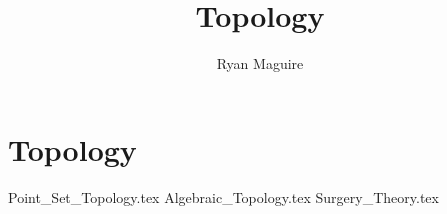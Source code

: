 \documentclass[crop=false,class=book,oneside]{standalone}
\begin{document}
    \newif\ifmathcourses
    \ifx\ifmain\undefined
        \title{Topology}
        \author{Ryan Maguire}
        \date{\vspace{-5ex}}
        \maketitle
        \tableofcontents
        \listoffigures
        \listoftables
        \clearpage
    \fi
    \part{Topology}
        {Point_Set_Topology.tex}
        {Algebraic_Topology.tex}
        {Surgery_Theory.tex}
\end{document}
